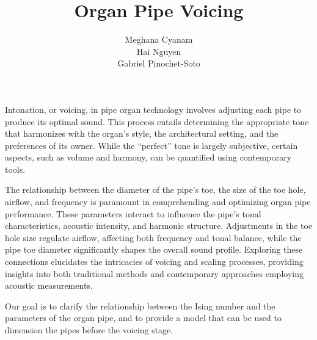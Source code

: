 \documentclass{psu-report}
\title{Organ Pipe Voicing}
\author{
    Meghana Cyanam \\
    Hai Nguyen \\
    Gabriel Pinochet-Soto \\
}
\begin{document}
\maketitle
\makecopyright

\begin{psuabstract}
    Intonation, or voicing, in pipe organ technology involves adjusting each
    pipe to produce its optimal sound.
    This process entails determining the appropriate tone that harmonizes with
    the organ’s style, the architectural setting, and the preferences of its
    owner.
    While the “perfect” tone is largely subjective, certain aspects, such as 
    volume and harmony, can be quantified using contemporary tools.
    
    The relationship between the diameter of the pipe’s toe, the size of the toe
    hole, airflow, and frequency is paramount in comprehending and optimizing
    organ pipe performance.
    These parameters interact to influence the pipe’s tonal characteristics,
    acoustic intensity, and harmonic structure. Adjustments in the toe hole size
    regulate airflow, affecting both frequency and tonal balance, while the pipe
    toe diameter significantly shapes the overall sound profile.
    Exploring these connections elucidates the intricacies of voicing and 
    scaling processes, providing insights into both traditional methods and
    contemporary approaches employing acoustic measurements.

    Our goal is to clarify the relationship between the Ising number and the
    parameters of the organ pipe, and to provide a model that can be used to
    dimension the pipes before the voicing stage.
\end{psuabstract}



\tableofcontents
\clearpage

\listoftables
\clearpage

\listoffigures
\clearpage

\end{document}
